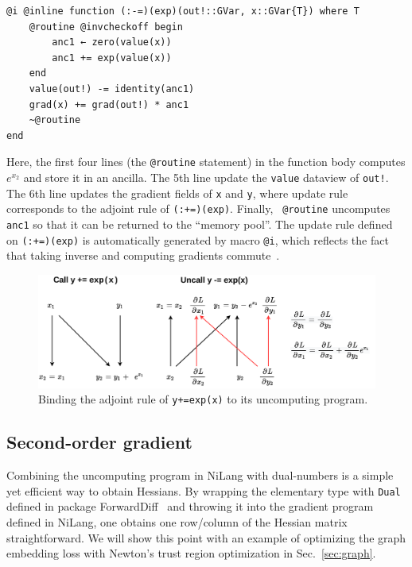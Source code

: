 \documentclass{article}
\newcommand{\<}{\langle}
\renewcommand{\>}{\rangle}
\newcommand{\Sec}[1]{Sec.~\ref{#1}}
\theoremstyle{definition}\newtheorem{definition}{\textit{Definition}}
\begin{document}
\begin{minipage}{.88\columnwidth}
\begin{lstlisting}[mathescape=true]
@i @inline function (:-=)(exp)(out!::GVar, x::GVar{T}) where T
    @routine @invcheckoff begin
        anc1 ← zero(value(x))
        anc1 += exp(value(x))
    end
    value(out!) -= identity(anc1)
    grad(x) += grad(out!) * anc1
    ~@routine
end
\end{lstlisting}
\end{minipage}

Here, the first four lines (the \texttt{@routine} statement) in the function body computes $e^{x_2}$ and store it in an ancilla. The 5th line update the \texttt{value} dataview of \texttt{out!}. The 6th line updates the gradient fields of \texttt{x} and \texttt{y}, where update rule corresponds to the adjoint rule of \texttt{(:+=)(exp)}. Finally, \texttt{~@routine} uncomputes \texttt{anc1} so that it can be returned to the ``memory pool''.
The update rule defined on \texttt{(:+=)(exp)} is automatically generated by macro \texttt{@i}, which reflects the fact that taking inverse and computing gradients commute~\cite{Mcinerney2015}.

\begin{figure}
    \centerline{\includegraphics[width=0.8\columnwidth,trim={0 0cm 0 0cm},clip]{reversead.pdf}}
    \caption{Binding the adjoint rule of \texttt{y+=exp(x)} to its uncomputing program.}\label{fig:reversead}
\end{figure}

\subsection{Second-order gradient}
Combining the uncomputing program in NiLang with dual-numbers is a simple yet efficient way to obtain Hessians.
By wrapping the elementary type with \texttt{Dual} defined in package ForwardDiff~\cite{Revels2016} and throwing it into the gradient program defined in NiLang,
one obtains one row/column of the Hessian matrix straightforward.
We will show this point with an example of optimizing the graph embedding loss with Newton's trust region optimization in \Sec{sec:graph}.
\end{document}
